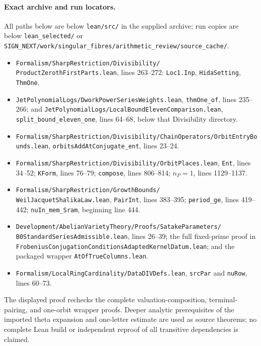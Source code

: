 \paragraph{Exact archive and run locators.}
All paths below are below \texttt{lean/src/} in the supplied archive;
run copies are below \texttt{lean\_selected/} or
\texttt{SIGN\_NEXT/work/singular\_fibres/arithmetic\_review/source\_cache/}.
\begin{itemize}
\item \texttt{Formalism/SharpRestriction/Divisibility/}
\texttt{ProductZerothFirstParts.lean}, lines 263--272:
\texttt{Loc1.Inp}, \texttt{HidaSetting}, \texttt{ThmOne}.
\item \texttt{JetPolynomialLogs/DworkPowerSeriesWeights.lean},
\texttt{thmOne\_of}, lines 235--266; and
\texttt{JetPolynomialLogs/LocalBoundElevenComparison.lean},
\texttt{split\_bound\_eleven\_one}, lines 64--68, below that
Divisibility directory.
\item \texttt{Formalism/SharpRestriction/Divisibility/ChainOperators/OrbitEntryBounds.lean},
\texttt{orbitsAddAtConjugate\_ent}, lines 23--24.
\item \texttt{Formalism/SharpRestriction/Divisibility/OrbitPlaces.lean},
\texttt{Ent}, lines 34--52; \texttt{KForm}, lines 76--79;
\texttt{compose}, lines 806--814; $n_P=1$, lines 1129--1137.
\item \texttt{Formalism/SharpRestriction/GrowthBounds/}
\texttt{WeilJacquetShalikaLaw.lean}, \texttt{PairInt}, lines 383--395;
\texttt{period\_ge}, lines 419--442;
\texttt{nuIn\_mem\_Sram}, beginning line 444.
\item \texttt{Development/AbelianVarietyTheory/Proofs/SatakeParameters/}
\texttt{B0StandardSeriesAdmissible.lean}, lines 26--39;
the full fixed-prime proof in
\texttt{FrobeniusConjugationConditionsAdaptedKernelDatum.lean};
and the packaged wrapper \texttt{AtOfTrueColumns.lean}.
\item \texttt{Formalism/LocalRingCardinality/DataDIVDefs.lean},
\texttt{srcPar} and \texttt{nuRow}, lines 60--73.
\end{itemize}
The displayed proof rechecks the complete valuation-composition,
terminal-pairing, and one-orbit wrapper proofs.  Deeper analytic
prerequisites of the imported theta expansion and one-letter estimate
are used as source theorems; no complete Lean build or independent
reproof of all transitive dependencies is claimed.
